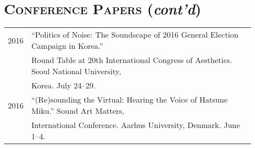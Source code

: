 \documentclass[letter,11pt,draft]{article}
\begin{document}
  \section*{\textsc{Conference Papers} (\textit{cont'd})}
  
  \hspace*{-0.25cm}
  \begin{tabular}{p{2.5cm} p{12.5cm}}
    2016 & “Politics of Noise: The Soundscape of 2016 General Election Campaign in Korea.”\\
    & Round Table at 20th International Congress of Aesthetics. Seoul National University,\\
    & Korea. July 24--29.\\[2mm]
  
    2016 & “(Re)sounding the Virtual: Hearing the Voice of Hatsune Miku.” Sound
    Art Matters,\\
    & International Conference. Aarhus University, Denmark. June 1--4.
  
  
    
  
    
  \end{tabular}
  
\end{document}
